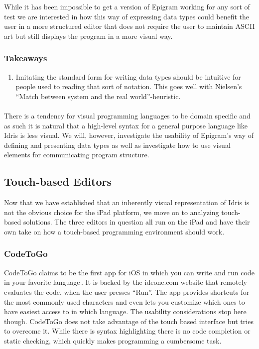 While it has been impossible to get a version of Epigram working for any sort of test we are interested in how this way of expressing data types could benefit the user in a more structured editor that does not require the user to maintain ASCII art but still displays the program in a more visual way.

\subsubsection{Takeaways}
\begin{enumerate}
	\item Imitating the standard form for writing data types should be intuitive for people used to reading that sort of notation. This goes well with Nielsen’s ``Match between system and the real world''-heuristic.
\end{enumerate}

\paragraph{}

There is a tendency for visual programming languages to be domain specific and
as such it is natural that a high-level syntax for a general purpose language
like Idris is less visual. We will, however, investigate the usability of Epigram's way of
defining and presenting data types as well as investigate how to use visual
elements for communicating program structure.



\subsection{Touch-based Editors}
\label{subsec:TouchBasedEditors}
Now that we have established that an inherently visual representation of Idris is not the obvious choice for the iPad platform, we move on to analyzing touch-based solutions. The three editors in question all run on the iPad and have their own take on how a touch-based programming environment should work.

\subsubsection{CodeToGo}
\label{subsub:CodeToGo}
CodeToGo claims to be the first app for iOS in which you can write and run code in your favorite language\,\cite{codetogo}. It is backed by the ideone.com website\cite{ideone} that remotely evaluates the code, when the user presses ``Run''. The app provides shortcuts for the most commonly used characters and even lets you customize which ones to have easiest access to in which language. The usability considerations stop here though. CodeToGo does not take advantage of the touch based interface but tries to overcome it. While there is syntax highlighting there is no code completion or static checking, which quickly makes programming a cumbersome task.

